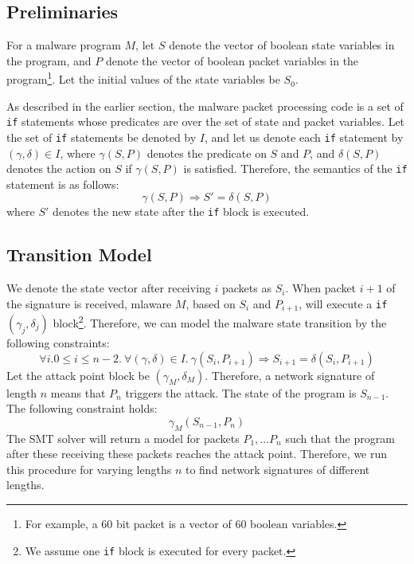 \documentclass[]{article}
\begin{document}
\subsection{Preliminaries}
For a malware program $M$, let $S$ denote
 the vector of boolean state variables in the program,
  and $P$ denote the vector of boolean packet variables
  in the program\footnote{
  	For example, a 60 bit packet is a vector 
  	of 60 boolean variables.}. Let the
  initial values of the state variables be $S_{0}$.

As described in the earlier section, the malware
packet processing code is a set of \texttt{if} 
statements whose predicates are over the set of state
and packet variables. Let the set of \texttt{if} 
statements be denoted by $I$, and let us denote each \texttt{if} 
statement by $(\gamma, \delta) \in I$, where $\gamma(S,P)$
denotes the predicate on $S$ and $P$, and $\delta(S,P)$ denotes
the action on $S$ if $\gamma(S,P)$ is satisfied. Therefore,
the semantics of the \texttt{if} statement is as follows:
\begin{equation}
\gamma(S,P) \Rightarrow S' = \delta(S,P)
\end{equation}
where $S'$ denotes the new state after the \texttt{if} 
block is executed.

\subsection{Transition Model}
We denote the state
vector after receiving $i$ packets as $S_i$.
When packet $i+1$ of the signature is received, 
mlaware $M$, based on $S_i$ and $P_{i+1}$, will execute 
a \texttt{if} $(\gamma_j, \delta_j)$ block\footnote{
	We assume one \texttt{if} block is executed for every packet.}.
Therefore, we can model the malware state transition 
by the following constraints: 
\begin{equation}
	\forall i. 0 \leq i \leq n-2.~\forall (\gamma, \delta) \in I. ~\gamma(S_i, P_{i+1}) \Rightarrow S_{i+1} = \delta(S_i, P_{i+1})
\end{equation}
Let the attack point block be $(\gamma_M, \delta_M)$. 
Therefore, a network signature of length $n$ means
that $P_n$ triggers the attack. The state of the program
is $S_{n-1}$. The following constraint holds:
\begin{equation}
	\gamma_M(S_{n-1},P_{n})
\end{equation}
The SMT solver will return a model for packets $P_1,
\ldots P_n$ such that the program after these receiving
these packets reaches the attack point. Therefore, 
we run this procedure for varying lengths $n$ to find
network signatures of different lengths.
\end{document}
